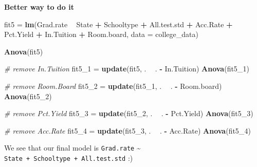 \documentclass[]{article}
\newenvironment{Shaded}{\begin{snugshade}}{\end{snugshade}}
\newcommand{\KeywordTok}[1]{\textcolor[rgb]{0.13,0.29,0.53}{\textbf{#1}}}
\newcommand{\DataTypeTok}[1]{\textcolor[rgb]{0.13,0.29,0.53}{#1}}
\newcommand{\DecValTok}[1]{\textcolor[rgb]{0.00,0.00,0.81}{#1}}
\newcommand{\StringTok}[1]{\textcolor[rgb]{0.31,0.60,0.02}{#1}}
\newcommand{\CommentTok}[1]{\textcolor[rgb]{0.56,0.35,0.01}{\textit{#1}}}
\newcommand{\OperatorTok}[1]{\textcolor[rgb]{0.81,0.36,0.00}{\textbf{#1}}}
\newcommand{\NormalTok}[1]{#1}
\begin{document}
\textbf{Better way to do it}

\begin{Shaded}
\begin{Highlighting}[]
\NormalTok{fit5 =}\StringTok{ }\KeywordTok{lm}\NormalTok{(Grad.rate }\OperatorTok{~}\StringTok{ }\NormalTok{State }\OperatorTok{+}\StringTok{ }\NormalTok{Schooltype }\OperatorTok{+}\StringTok{ }\NormalTok{All.test.std }\OperatorTok{+}\StringTok{ }\NormalTok{Acc.Rate }\OperatorTok{+}\StringTok{ }\NormalTok{Pct.Yield }\OperatorTok{+}\StringTok{ }
\StringTok{    }\NormalTok{In.Tuition }\OperatorTok{+}\StringTok{ }\NormalTok{Room.board, }\DataTypeTok{data =}\NormalTok{ college_data)}
\end{Highlighting}
\end{Shaded}

\begin{Shaded}
\begin{Highlighting}[]
\KeywordTok{Anova}\NormalTok{(fit5)}

\CommentTok{# remove In.Tuition}
\NormalTok{fit5_}\DecValTok{1}\NormalTok{ =}\StringTok{ }\KeywordTok{update}\NormalTok{(fit5, . }\OperatorTok{~}\StringTok{ }\NormalTok{. }\OperatorTok{-}\StringTok{ }\NormalTok{In.Tuition)}
\KeywordTok{Anova}\NormalTok{(fit5_}\DecValTok{1}\NormalTok{)}

\CommentTok{# remove Room.Board}
\NormalTok{fit5_}\DecValTok{2}\NormalTok{ =}\StringTok{ }\KeywordTok{update}\NormalTok{(fit5_}\DecValTok{1}\NormalTok{, . }\OperatorTok{~}\StringTok{ }\NormalTok{. }\OperatorTok{-}\StringTok{ }\NormalTok{Room.board)}
\KeywordTok{Anova}\NormalTok{(fit5_}\DecValTok{2}\NormalTok{)}

\CommentTok{# remove Pct.Yield}
\NormalTok{fit5_}\DecValTok{3}\NormalTok{ =}\StringTok{ }\KeywordTok{update}\NormalTok{(fit5_}\DecValTok{2}\NormalTok{, . }\OperatorTok{~}\StringTok{ }\NormalTok{. }\OperatorTok{-}\StringTok{ }\NormalTok{Pct.Yield)}
\KeywordTok{Anova}\NormalTok{(fit5_}\DecValTok{3}\NormalTok{)}

\CommentTok{# remove Acc.Rate}
\NormalTok{fit5_}\DecValTok{4}\NormalTok{ =}\StringTok{ }\KeywordTok{update}\NormalTok{(fit5_}\DecValTok{3}\NormalTok{, . }\OperatorTok{~}\StringTok{ }\NormalTok{. }\OperatorTok{-}\StringTok{ }\NormalTok{Acc.Rate)}
\KeywordTok{Anova}\NormalTok{(fit5_}\DecValTok{4}\NormalTok{)}
\end{Highlighting}
\end{Shaded}

We see that our final model is \texttt{Grad.rate} \textasciitilde{}
\texttt{State\ +\ Schooltype\ +\ All.test.std} :)
\end{document}
